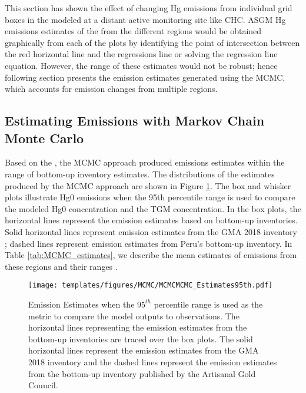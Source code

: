 \begin{flushleft}
     This section has shown the effect of changing Hg emissions from individual grid boxes in the modeled \hgc at a distant active monitoring site like CHC. ASGM Hg emissions estimates of the from the different regions would be obtained graphically from each of the plots by identifying the point of intersection between the red horizontal line and the regressions line or solving the regression line equation. However, the range of these estimates would not be robust; hence following section presents the emission estimates generated using the MCMC, which accounts for emission changes from multiple regions. 

\end{flushleft}

\subsection{Estimating Emissions with Markov Chain Monte Carlo}\label{c3_mcmc_estimates}
Based on the \nft, the MCMC approach produced \hg emissions estimates within the range of bottom-up inventory estimates. The distributions of the estimates produced by the MCMC approach are shown in Figure \ref{fig:MCMC_estimates95th}. The box and whisker plots illustrate Hg0 emissions when the 95th percentile range is used to compare the modeled Hg0 concentration and the TGM concentration. In the box plots, the horizontal lines represent the emission estimates based on bottom-up inventories. Solid horizontal lines represent emission estimates from the GMA 2018 inventory \cite{united_nations_environment_programme_technical_2019,steenhuisen_development_2019}; dashed lines represent emission estimates from Peru's bottom-up inventory. In Table \ref{tab:MCMC_estimates}, we describe the mean estimates of emissions from these regions and their ranges \cite{agc_reporte_2017}.  

\begin{figure}[H]
  \texttt{[image: templates/figures/MCMC/MCMCMCMC\_Estimates95th.pdf]}
  \centering
  \caption[Emission Estimates when the $95^{th}$ percentile range is used as the metric to compare the model outputs to observations.]{Emission Estimates when the $95^{th}$ percentile range is used as the metric to compare the model outputs to observations. The horizontal lines representing the emission estimates from the bottom-up inventories are traced over the box plots. The solid horizontal lines represent the emission estimates from the GMA 2018 inventory \cite{united_nations_environment_programme_technical_2019,steenhuisen_development_2019} and the dashed lines represent the emission estimates from the bottom-up inventory published by the Artisanal Gold Council\cite{agc_reporte_2017}.}
  \label{fig:MCMC_estimates95th}
\end{figure}
\FloatBarrier

